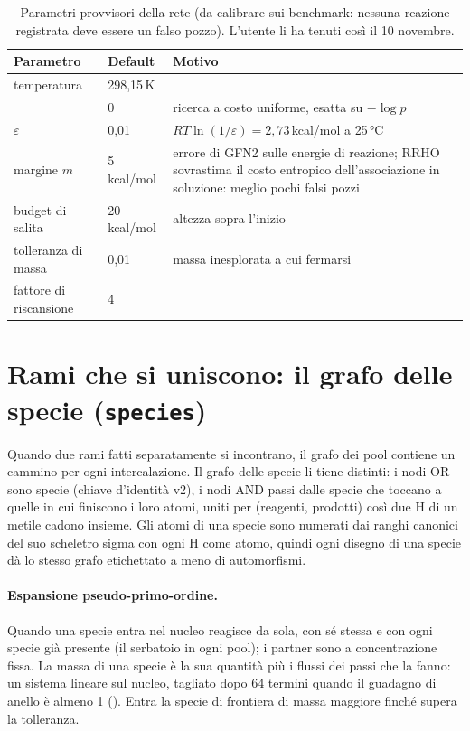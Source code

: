 \documentclass[11pt,a4paper]{report}
\newcommand{\code}[1]{\texttt{\detokenize{#1}}}
\begin{document}
\begin{table}[H]
\centering
\caption{Parametri provvisori della rete (da calibrare sui benchmark: nessuna reazione registrata deve
essere un falso pozzo). L'utente li ha tenuti così il 10 novembre.}
\label{tab:rete-param}
\small
\begin{tabular}{@{}p{4.6cm}p{2.6cm}p{8.2cm}@{}}
\toprule
Parametro & Default & Motivo\\
\midrule
temperatura & 298{,}15\,K & \\
\code{step_cost} & 0 & ricerca a costo uniforme, esatta su $-\log p$\\
$\varepsilon$ & 0{,}01 & $RT\ln(1/\varepsilon)=2{,}73$\,kcal/mol a 25\,°C\\
margine $m$ & 5\,kcal/mol & errore di GFN2 sulle energie di reazione; RRHO sovrastima il costo entropico
  dell'associazione in soluzione: meglio pochi falsi pozzi\\
budget di salita & 20\,kcal/mol & altezza sopra l'inizio\\
tolleranza di massa & 0{,}01 & massa inesplorata a cui fermarsi\\
fattore di riscansione & 4 & \\
\bottomrule
\end{tabular}
\end{table}

\section{Rami che si uniscono: il grafo delle specie (\texttt{species})}
Quando due rami fatti separatamente si incontrano, il grafo dei pool contiene un cammino per ogni
intercalazione. Il grafo delle specie li tiene distinti: i nodi OR sono specie (chiave d'identità v2), i
nodi AND passi dalle specie che toccano a quelle in cui finiscono i loro atomi, uniti per (reagenti,
prodotti) così due H di un metile cadono insieme. Gli atomi di una specie sono numerati dai ranghi
canonici del suo scheletro sigma con ogni H come atomo, quindi ogni disegno di una specie dà lo stesso
grafo etichettato a meno di automorfismi.

\paragraph{Espansione pseudo-primo-ordine.} Quando una specie entra nel nucleo reagisce da sola, con sé
stessa e con ogni specie già presente (il serbatoio in ogni pool); i partner sono a concentrazione fissa.
La massa di una specie è la sua quantità più i flussi dei passi che la fanno: un sistema lineare sul
nucleo, tagliato dopo 64 termini quando il guadagno di anello è almeno 1 (\code{MASS_DIVERGED}). Entra la
specie di frontiera di massa maggiore finché supera la tolleranza.
\end{document}
